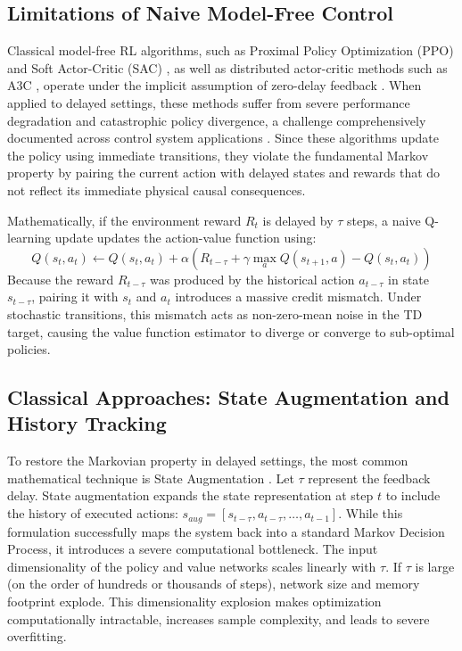 \documentclass[manuscript, screen, review]{jair}
\begin{document}
\subsection{Limitations of Naive Model-Free Control}
Classical model-free RL algorithms, such as Proximal Policy Optimization (PPO) \citep{schulman2017ppo} and Soft Actor-Critic (SAC) \citep{haarnoja2018soft}, as well as distributed actor-critic methods such as A3C \citep{mnih2016async}, operate under the implicit assumption of zero-delay feedback \citep{sutton2018reinforcement}. When applied to delayed settings, these methods suffer from severe performance degradation and catastrophic policy divergence, a challenge comprehensively documented across control system applications \citep{alves2026survey}. Since these algorithms update the policy using immediate transitions, they violate the fundamental Markov property by pairing the current action with delayed states and rewards that do not reflect its immediate physical causal consequences.

Mathematically, if the environment reward $R_t$ is delayed by $\tau$ steps, a naive Q-learning update updates the action-value function using:
\begin{equation}
    Q(s_t, a_t) \leftarrow Q(s_t, a_t) + \alpha \left( R_{t-\tau} + \gamma \max_a Q(s_{t+1}, a) - Q(s_t, a_t) \right)
\end{equation}
Because the reward $R_{t-\tau}$ was produced by the historical action $a_{t-\tau}$ in state $s_{t-\tau}$, pairing it with $s_t$ and $a_t$ introduces a massive credit mismatch. Under stochastic transitions, this mismatch acts as non-zero-mean noise in the TD target, causing the value function estimator to diverge or converge to sub-optimal policies.

\subsection{Classical Approaches: State Augmentation and History Tracking}
To restore the Markovian property in delayed settings, the most common mathematical technique is State Augmentation \citep{katsikopoulos2003markov}. Let $\tau$ represent the feedback delay. State augmentation expands the state representation at step $t$ to include the history of executed actions: $s_{aug} = [s_{t-\tau}, a_{t-\tau}, \dots, a_{t-1}]$. While this formulation successfully maps the system back into a standard Markov Decision Process, it introduces a severe computational bottleneck. The input dimensionality of the policy and value networks scales linearly with $\tau$. If $\tau$ is large (on the order of hundreds or thousands of steps), network size and memory footprint explode. This dimensionality explosion makes optimization computationally intractable, increases sample complexity, and leads to severe overfitting.
\end{document}
